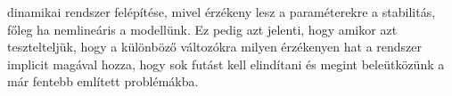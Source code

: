 \documentclass{article}
\theoremstyle{definition}
\theoremstyle{theorem}
\begin{document}
dinamikai rendszer felépítése, mivel érzékeny lesz a paraméterekre a stabilitás, főleg ha nemlineáris a modellünk. Ez pedig azt jelenti, hogy amikor azt tesztelteljük, hogy a különböző változókra milyen érzékenyen hat a rendszer implicit magával hozza, hogy sok futást kell elindítani és megint beleütközünk a már fentebb említett problémákba.


\end{document}

